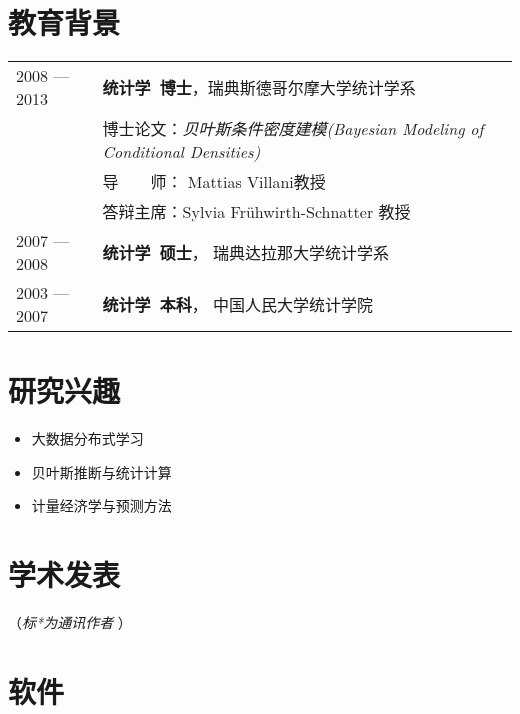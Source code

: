 \documentclass[twoside,a4paper,10pt]{amsart}
\begin{document}
\section*{教育背景}

\begin{tabular}{ l  p{} l}
  2008 --- 2013 & \textbf{统计学~博士}，瑞典斯德哥尔摩大学统计学系 \\
                & 博士论文：\emph{贝叶斯条件密度建模(Bayesian Modeling of Conditional Densities)}          \\
                & 导　　师： Mattias Villani教授                       \\
                & 答辩主席：Sylvia Frühwirth-Schnatter 教授        \\

  2007 --- 2008 & \textbf{统计学~硕士}， 瑞典达拉那大学统计学系\\

  2003 --- 2007 & \textbf{统计学~本科}， 中国人民大学统计学院\\
\end{tabular}

\section*{研究兴趣}

\begin{itemize}
\item 大数据分布式学习
\item 贝叶斯推断与统计计算
\item 计量经济学与预测方法

\end{itemize}

\section*{学术发表}
（\emph{标*为通讯作者} ）
\nocite{pan2021note_jbes}
\nocite{talagala2021fformpp_ijf}
\nocite{zhu2021least_jcgs}
\nocite{wang2021uncertainty_jors}
\nocite{kang2021deja_jbr}
\nocite{hao2020bilinear}
\nocite{li2020forecasting}
\nocite{kang2020gratis_sam}
\nocite{li2020fppcn}
\nocite{kalesan2020intersections}
\nocite{bailey2019changes}
\nocite{li2019credit}
\nocite{li2018improving_ijf}
\nocite{pino2018cohort}
\nocite{li2016distributedcn}
\nocite{li2013bayesian}
\nocite{li2013efficient_sjs}
\nocite{li2011modeling}
\nocite{li2010flexible_jspi}
\printbibliography[heading=none, nottype=software]

\section*{软件}
\nocite{gratis}
\nocite{spark-dlsa}
\printbibliography[heading=none, type=software]
\end{document}
